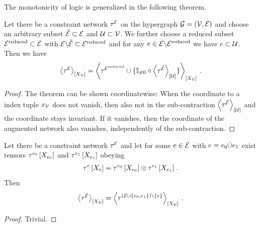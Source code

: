 
The monotonicity of logic is generalized in the following theorem.

\begin{theorem}
    Let there be a constraint network $\tau^{\mathcal{E}}$ on the hypergraph $\mathcal{G}=(\mathcal{V},\mathcal{E})$ and choose an arbitrary subset $\tilde{\mathcal{E}}\subset\mathcal{E}$ and $\mathcal{U}\subset\mathcal{V}$.
    We further choose a reduced subset $\mathcal{E}^{\mathrm{reduced}}\subset\mathcal{E}$ with $\mathcal{E}\backslash\tilde{\mathcal{E}} \subset\mathcal{E}^{\mathrm{reduced}}$ and for any $e\in\mathcal{E}\backslash\mathcal{E}^{\mathrm{reduced}}$ we have $e\subset\mathcal{U}$.
    Then we have
    \begin{align*}
        \left\langle \tau^{\mathcal{E}}\right\rangle_{\left[ X_{\mathcal{V}} \right]}
        =
        \left\langle 
            \tau^{\mathcal{E}^{\mathrm{reduced}}}
            \cup \{\mathbb{I}_{\neq0}\circ\left\langle \tau^{\tilde{\mathcal{E}}}\right\rangle_{\left[ \mathcal{U} \right]}\}
        \right\rangle_{\left[ X_{\mathcal{V}} \right]} \, .
    \end{align*}
\end{theorem}
\begin{proof}
    The theorem can be shown coordinatewise:
    When the coordinate to a index tuple $x_{\mathcal{V}}$ does not vanish, then also not in the sub-contraction $\left\langle \tau^{\tilde{\mathcal{E}}}\right\rangle_{\left[ \mathcal{U} \right]}$ and the coordinate stays invariant.
    If it vanishes, then the coordinate of the augmented network also vanishes, independently of the sub-contraction.
\end{proof}


\begin{theorem}
    Let there be a constraint network $\tau^{\mathcal{E}}$ and let for some $e\in\mathcal{E}$ with $e=e_{0}\dot{\cup}e_{1}$ exist tensors $\tau^{e_{0}}\left[X_{e_{0}}\right]$ and $\tau^{e_{1}}\left[X_{e_{1}}\right]$ obeying
    \begin{align*}
        \tau^{e}\left[X_{e}\right]
        =  \tau^{e_{0}}\left[X_{e_{0}}\right] \otimes  \tau^{e_{1}}\left[X_{e_{1}}\right] \, .
    \end{align*}
    Then
    \begin{align*}
        \left\langle \tau^{\mathcal{E}}\right\rangle_{\left[ X_{\mathcal{V}} \right]}
        = \left\langle \tau^{(\mathcal{E}\cup\{e_{0},e_{1}\})\backslash\{e\}}\right\rangle_{\left[ X_{\mathcal{V}} \right]} \, .
    \end{align*}

\end{theorem}
\begin{proof}
    Trivial.
\end{proof}

